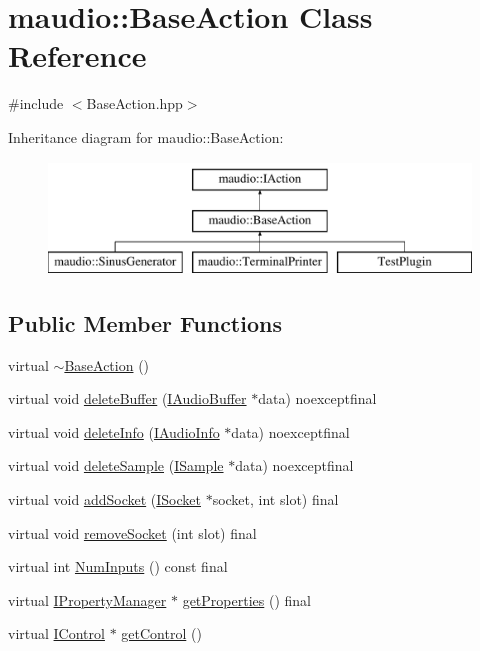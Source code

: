 \hypertarget{classmaudio_1_1BaseAction}{\section{maudio\-:\-:Base\-Action Class Reference}
\label{classmaudio_1_1BaseAction}
}


{\ttfamily \#include $<$Base\-Action.\-hpp$>$}

Inheritance diagram for maudio\-:\-:Base\-Action\-:\begin{figure}[H]
\begin{center}
\leavevmode
\includegraphics[height=3.000000cm]{classmaudio_1_1BaseAction}
\end{center}
\end{figure}
\subsection*{Public Member Functions}
\begin{DoxyCompactItemize}
\item 
virtual \hyperlink{classmaudio_1_1BaseAction_a98e6cd7921c24d73bf561dfabff89838}{$\sim$\-Base\-Action} ()
\item 
virtual void \hyperlink{classmaudio_1_1BaseAction_a2c5422376581a5d01873833516858753}{delete\-Buffer} (\hyperlink{classmaudio_1_1IAudioBuffer}{I\-Audio\-Buffer} $\ast$data) noexceptfinal
\item 
virtual void \hyperlink{classmaudio_1_1BaseAction_ade1df46a9e5edc1931f3c061f3d51402}{delete\-Info} (\hyperlink{classmaudio_1_1IAudioInfo}{I\-Audio\-Info} $\ast$data) noexceptfinal
\item 
virtual void \hyperlink{classmaudio_1_1BaseAction_a4c1f3d0c024bbdff115ac261bbf1a32c}{delete\-Sample} (\hyperlink{classmaudio_1_1ISample}{I\-Sample} $\ast$data) noexceptfinal
\item 
virtual void \hyperlink{classmaudio_1_1BaseAction_a0e3fe3ae02cdf315fd63944d46419e6e}{add\-Socket} (\hyperlink{classmaudio_1_1ISocket}{I\-Socket} $\ast$socket, int slot) final
\item 
virtual void \hyperlink{classmaudio_1_1BaseAction_aac97bab055f68c49941dbaae9a1ff497}{remove\-Socket} (int slot) final
\item 
virtual int \hyperlink{classmaudio_1_1BaseAction_a25f6c6801b1643bdc0a2bc9bb3534654}{Num\-Inputs} () const final
\item 
virtual \hyperlink{classmaudio_1_1IPropertyManager}{I\-Property\-Manager} $\ast$ \hyperlink{classmaudio_1_1BaseAction_ada21aa4734308191a32a9a2fe1dd4e3d}{get\-Properties} () final
\item 
virtual \hyperlink{classmaudio_1_1IControl}{I\-Control} $\ast$ \hyperlink{classmaudio_1_1BaseAction_a0ecc4f8e47f52d90b0ba7fe2757efe2c}{get\-Control} ()
\end{DoxyCompactItemize}
